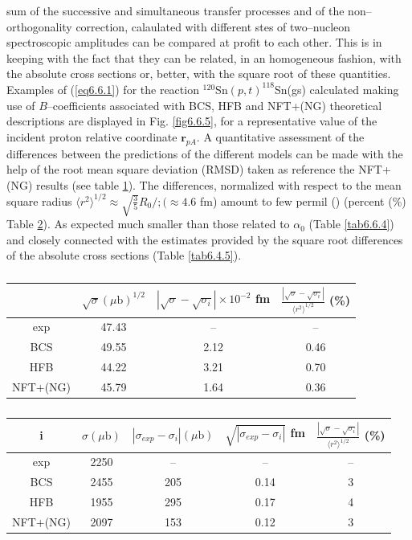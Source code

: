 sum of the successive and simultaneous transfer processes and of the non--orthogonality correction, calaulated with different stes of two--nucleon spectroscopic amplitudes can be compared at profit to each other. This is in keeping with the fact that they can be related, in an homogeneous fashion, with the absolute cross sections or, better, with the square root of these quantities. Examples of (\ref{eq6.6.1}) for the reaction $^{120}$Sn$(p,t)^{118}$Sn(gs) calculated making use of $B$--coefficients associated with BCS, HFB and NFT+(NG) theoretical descriptions are displayed in Fig. \ref{fig6.6.5}, for a representative value of the incident proton relative coordinate $\mathbf r_{pA}$. A quantitative assessment of the differences between the predictions of the different models can be made with the help of the root mean square deviation (RMSD) taken as reference the NFT+(NG) results (see table \ref{tab6.6.2}). The differences, normalized with respect to the mean square radius $\langle r^2\rangle^{1/2}\approx\sqrt{\frac{3}{5}}R_0/;(\approx 4.6$ fm) amount to few permil (\textperthousand)   (percent (\%) Table \ref{tab6.6.3}). As expected much smaller than those related to $\alpha_0$ (Table \ref{tab6.6.4}) and closely connected with the estimates provided by the square root differences of the absolute cross sections (Table \ref{tab6.4.5}).

\begin{table}
\begin{center}
\begin{tabular}{|c|c|c|c|}
\hline
    & $\sqrt{\sigma}(\mu\text{b})^{1/2}$  & $\left|\sqrt{\sigma}-\sqrt{\sigma_i}\right|\times10^{-2}$ fm & $\frac{\left|\sqrt{\sigma}-\sqrt{\sigma_i}\right|}{\langle r^2\rangle^{1/2}}$ (\%) \\ 
 \hline 
 exp&47.43&--&--\\
 \hline
 BCS&49.55&2.12&0.46\\
 \hline
 HFB&44.22&3.21&0.70\\
 \hline
 NFT+(NG)&45.79&1.64&0.36\\
 \hline
\end{tabular}
\end{center}
\caption{}\label{tab6.6.2}
\end{table} 

\begin{table}
\begin{center}
\begin{tabular}{|c|c|c|c|c|}
\hline
   i& $\sigma (\mu\text{b})$& $\left|{\sigma_{exp}}-{\sigma_i}\right|(\mu\text{b})$ & $\sqrt{\left|{\sigma_{exp}}-{\sigma_i}\right|}$ fm& $\frac{\left|\sqrt{\sigma}-\sqrt{\sigma_i}\right|}{\langle r^2\rangle^{1/2}}$ (\%) \\ 
 \hline 
 exp&2250&--&--&--\\
 \hline
 BCS&2455&205&0.14&3\\
 \hline
 HFB&1955&295&0.17&4\\
 \hline
 NFT+(NG)&2097&153&0.12&3\\
 \hline
\end{tabular}
\end{center}
\caption{}\label{tab6.6.3}
\end{table} 

